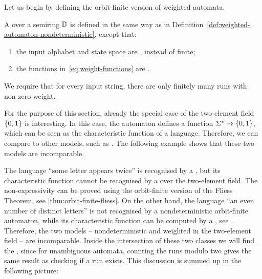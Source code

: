 Let us begin by defining the orbit-finite version of weighted automata. 
\begin{definition}
    \label{def:weighted-orbit-finite-automata}
    \AP
    A  over a semiring $\mathbb D$ is 
    defined in the same way as in Definition~\ref{def:weighted-automaton-nondeterministic}, except that:
    \begin{enumerate}
      \item the input alphabet and state space are , instead of finite;
      \item the functions in~\eqref{eq:weight-functions} are .
    \end{enumerate}
     We require that for every input string, there are only finitely many runs with non-zero weight.
\end{definition}

For the purpose of this section, already the special case of the two-element
field $\{0,1\}$ is interesting. In this case, the automaton defines a
function $\Sigma^* \to \{0,1\}$, which can be seen as the characteristic
function of a language. Therefore, we can compare  to other models, such as . The
following example shows that these two  models are incomparable. 

\begin{myexample}\label{ex:weighted-vs-nondet-orbit-finite}
  The language ``some letter appears twice'' is recognised by a
  , but its characteristic function
  cannot be  recognised by a  over the
  two-element field. The non-expressivity can be proved using the orbit-finite
  version of the Fliess Theorem, see \cref{thm:orbit-finite-fliess}. On the
  other hand, the  language ``an even number of distinct letters'' is not
  recognised by a nondeterministic orbit-finite automaton, while its
  characteristic function can be computed by a , see~\cite[Example 3.2]{orbitFiniteVectorTheoretics}. Therefore,
  the two models -- nondeterministic and weighted in the two-element field --
  are incomparable. Inside the intersection of these two classes we will find
  the , since for unambiguous automata, counting the runs
  modulo two gives the same result as checking if a run exists. This discussion
  is summed up in the following picture:
\end{myexample}

